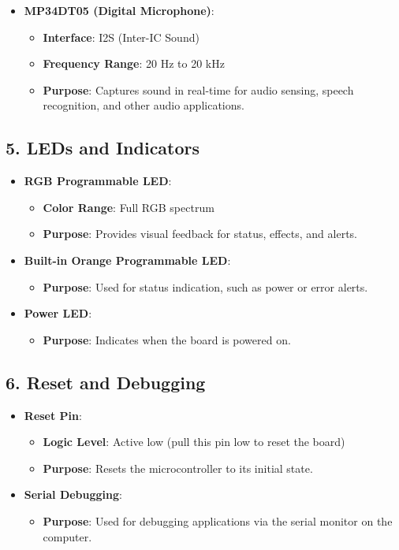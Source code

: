\begin{itemize}
		\item \textbf{MP34DT05 (Digital Microphone)}:
		\begin{itemize}
			\item \textbf{Interface}: I2S (Inter-IC Sound)
			\item \textbf{Frequency Range}: 20 Hz to 20 kHz
			\item \textbf{Purpose}: Captures sound in real-time for audio sensing, speech recognition, and other audio applications.
		\end{itemize}
	\end{itemize}
	
	\subsection*{5. LEDs and Indicators}
	
	\begin{itemize}
		\item \textbf{RGB Programmable LED}:
		\begin{itemize}
			\item \textbf{Color Range}: Full RGB spectrum
			\item \textbf{Purpose}: Provides visual feedback for status, effects, and alerts.
		\end{itemize}
		
		\item \textbf{Built-in Orange Programmable LED}:
		\begin{itemize}
			\item \textbf{Purpose}: Used for status indication, such as power or error alerts.
		\end{itemize}
		
		\item \textbf{Power LED}:
		\begin{itemize}
			\item \textbf{Purpose}: Indicates when the board is powered on.
		\end{itemize}
	\end{itemize}
	
	\subsection*{6. Reset and Debugging}
	
	\begin{itemize}
		\item \textbf{Reset Pin}:
		\begin{itemize}
			\item \textbf{Logic Level}: Active low (pull this pin low to reset the board)
			\item \textbf{Purpose}: Resets the microcontroller to its initial state.
		\end{itemize}
		
		\item \textbf{Serial Debugging}:
		\begin{itemize}
			\item \textbf{Purpose}: Used for debugging applications via the serial monitor on the computer.
		\end{itemize}
	\end{itemize}

